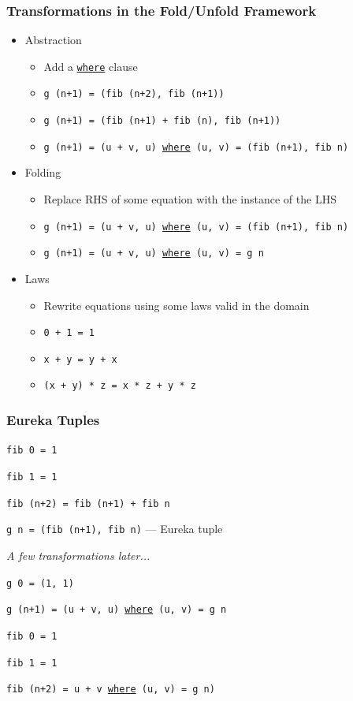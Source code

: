 \documentclass{beamer}
\begin{document}
\begin{frame}[fragile]
  \frametitle{Transformations in the Fold/Unfold Framework}
\begin{itemize}
  \item Abstraction
  \begin{itemize}
    \item Add a \texttt{\underline{where}} clause
    \item \texttt{g (n+1) = (fib (n+2), fib (n+1)) }
    \item \texttt{g (n+1) = (fib (n+1) + fib (n), fib (n+1))}
    \item \texttt{g (n+1) = (u + v, u) \underline{where} (u, v) = (fib (n+1), fib n)}
  \end{itemize}
  \item Folding
  \begin{itemize}
    \item Replace RHS of some equation with the instance of the LHS
    \item \texttt{g (n+1) = (u + v, u) \underline{where} (u, v) = (fib (n+1), fib n)}
    \item \texttt{g (n+1) = (u + v, u) \underline{where} (u, v) = g n}
  \end{itemize}
  \item Laws
  \begin{itemize}
    \item Rewrite equations using some laws valid in the domain
    \item \texttt{0 + 1 = 1}
    \item \texttt{x + y = y + x}
    \item \texttt{(x + y) * z = x * z + y * z}
  \end{itemize}
\end{itemize}
\end{frame}

\begin{frame}[t]
  \frametitle{Eureka Tuples}
\texttt{fib 0 = 1}

\texttt{fib 1 = 1}

\texttt{fib (n+2) = fib (n+1) + fib n}

\pause

\vspace{0.5cm}

\texttt{g n = (fib (n+1), fib n)} --- Eureka tuple

\pause

\vspace{0.5cm}

\textit{A few transformations later...}

\vspace{0.5cm}

\texttt{g 0 = (1, 1)}

\texttt{g (n+1) = (u + v, u) \underline{where} (u, v) = g n}

\vspace{0.5cm}
\texttt{fib 0 = 1}

\texttt{fib 1 = 1}

\texttt{fib (n+2) = u + v \underline{where} (u, v) = g n)}
\end{frame}
\end{document}
